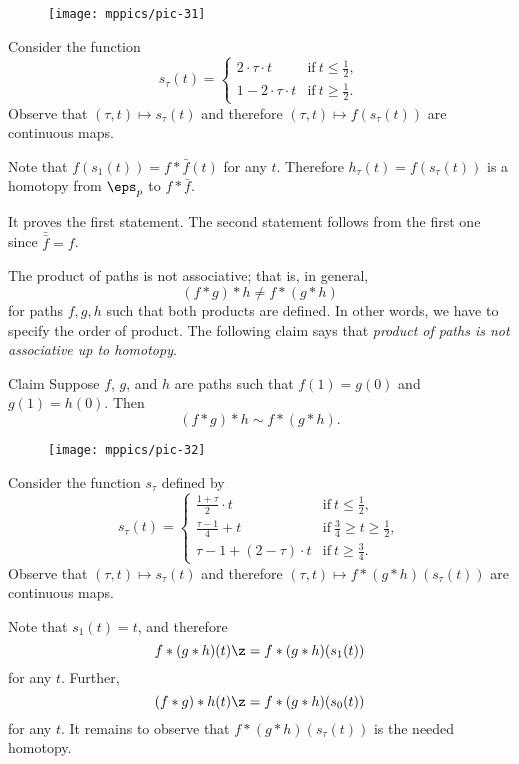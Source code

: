 \begin{wrapfigure}[4]{r}{30mm}
\centering
\vskip-10mm
\texttt{[image: mppics/pic-31]}
\end{wrapfigure}

Consider the function
\[s_\tau(t)=
\begin{cases}
2\cdot \tau \cdot t&\text{if}\ t\le \tfrac12,
\\
1-2\cdot \tau \cdot t&\text{if}\ t\ge \tfrac12.
\end{cases}
\]
Observe that $(\tau,t)\mapsto s_\tau(t)$ and therefore $(\tau,t)\mapsto f(s_\tau(t))$ are continuous maps.

Note that $f(s_1(t))=f*\bar f(t)$ for any $t$.
Therefore $h_\tau(t)=f(s_\tau(t))$ is a homotopy from $\eps_p$ to $f*\bar f$.

It proves the first statement.
The second statement follows from the first one since $\bar{\bar f}=f$.
\qeds

The product of paths is not associative;
that is, in general,
\[(f*g)*h\ne f*(g*h)\]
for paths $f,g,h$ such that both products are defined.
In other words, we have to specify the order of product.
The following claim says that \textit{product of paths is not associative up to homotopy}.

\begin{thm}{Claim}\label{clm:assoc}
Suppose $f$, 
$g$,
and
$h$ are paths such that $f(1)=g(0)$ and $g(1)=h(0)$.
Then
\[(f*g)*h\sim f*(g*h).\]
\end{thm}

\begin{wrapfigure}[3]{r}{30mm}
\centering
\vskip-4mm
\texttt{[image: mppics/pic-32]}
\end{wrapfigure}

Consider the function $s_\tau$ defined by 
\[s_\tau(t)=
\begin{cases}
\tfrac{1+\tau}2\cdot t&\text{if}\ t\le \tfrac12,
\\
\tfrac{\tau-1}4+t&\text{if}\ \tfrac 34\ge t\ge \tfrac12,
\\
\tau-1+ (2-\tau)\cdot t&\text{if}\  t\ge \tfrac34.
\end{cases}
\]
Observe that $(\tau,t)\mapsto s_\tau(t)$ and therefore $(\tau,t)\mapsto f*(g*h)(s_\tau(t))$ are continuous maps.

Note that $s_1(t)=t$,
and therefore \[f*(g*h)(t)\z=f*(g*h)(s_1(t))\] for any $t$.
Further, 
\[(f*g)*h(t)\z=f*(g*h)(s_0(t))\] for any $t$.
It remains to observe that $f*(g*h)(s_\tau(t))$ is the needed homotopy.
\qeds

